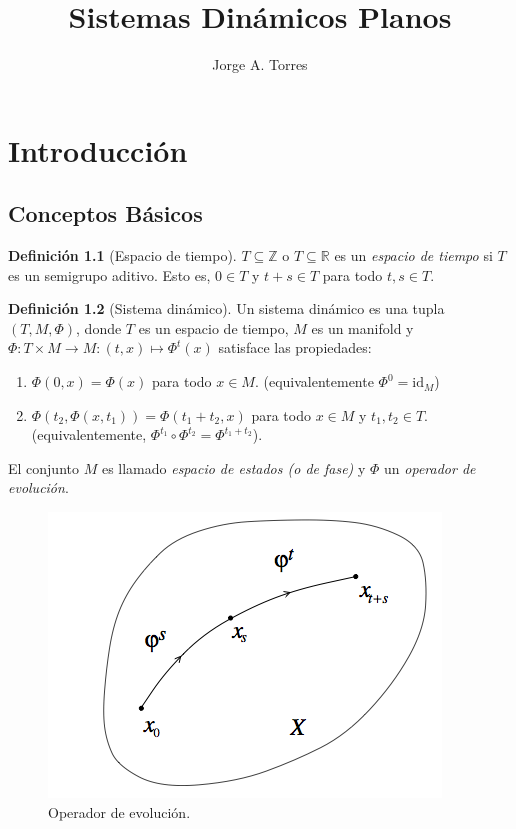 \documentclass[11pt]{book}
\theoremstyle{definition}
\newtheorem{definition}{Definición}
\numberwithin{definition}{section}
\theoremstyle{theorem}
\numberwithin{theorem}{section}
\numberwithin{lemma}{section}
\numberwithin{corollary}{section}
\theoremstyle{plain}
\numberwithin{example}{section}
\begin{document}
\title{Sistemas Dinámicos Planos}
\author{Jorge A. Torres}
\maketitle

\tableofcontents

\chapter{Introducción}
\label{cap:introduccion}

\section{Conceptos Básicos}

\begin{definition}[Espacio de tiempo] $T \subseteq \mathbb{Z}$ o $T \subseteq \mathbb{R}$ es un \emph{espacio de tiempo} si $T$ es un semigrupo aditivo. Esto es, $0 \in T$ y $t + s \in T$ para todo $t,s \in T$.
\end{definition}
    
\begin{definition}[Sistema dinámico] \label{def:dynamicalsystem}
Un sistema din\'amico es una tupla $\left( T, M, \Phi \right)$, donde $T$ es un espacio de tiempo, $M$ es un manifold y $\Phi : T \times M \rightarrow M : \left( t, x \right) \mapsto \Phi^t \left( x \right)$ satisface las propiedades:
  \begin{enumerate}[(D1)]
    \item $\Phi \left( 0, x \right) = \Phi \left( x \right)$ para todo $x \in
    M$. (equivalentemente $\Phi^0 = \text{id}_M$)
    
    \item $\Phi \left( t_2, \Phi \left( x, t_1 \right) \right) = \Phi \left(
    t_1 + t_2, x \right)$ para todo $x \in M$ y $t_1, t_2 \in T$.
    (equivalentemente, $\Phi^{t_1} \circ \Phi^{t_2} = \Phi^{t_1 + t_2}$).
  \end{enumerate}

  El conjunto $M$ es llamado {\emph{espacio de estados (o de fase)}} y
  $\Phi$ un {\emph{operador de evoluci\'on}}.
\end{definition}

\begin{figure} \label{fig:evolutionoperator} \centering
    \includegraphics[scale=0.5]{figures/evolutionoperator.png}    
    \caption{Operador de evolución.}
\end{figure}
\end{document}
